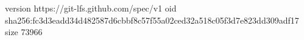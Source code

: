 version https://git-lfs.github.com/spec/v1
oid sha256:fc3d3eadd34d482587d6cbbf8c57f55a02ced32a518c05f3d7e823dd309adf17
size 73966
